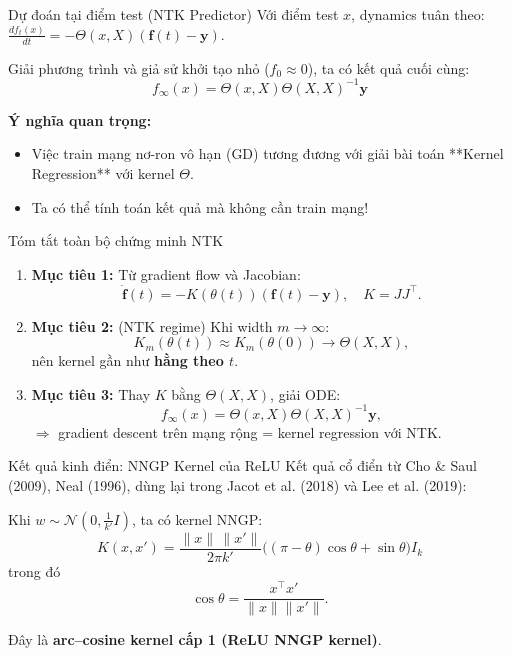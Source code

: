 \begin{frame}{Dự đoán tại điểm test (NTK Predictor)}
  Với điểm test $x$, dynamics tuân theo: $\frac{df_t(x)}{dt} = -\Theta(x,X)(\mathbf f(t) - \mathbf y)$.
  
  Giải phương trình và giả sử khởi tạo nhỏ ($f_0 \approx 0$), ta có kết quả cuối cùng:
  \[
    \boxed{ f_\infty(x) = \Theta(x,X)\Theta(X,X)^{-1}\mathbf y }
  \]

  \textbf{Ý nghĩa quan trọng:}
  \begin{itemize}
    \item Việc train mạng nơ-ron vô hạn (GD) tương đương với giải bài toán **Kernel Regression** với kernel $\Theta$.
    \item Ta có thể tính toán kết quả mà không cần train mạng!
  \end{itemize}
\end{frame}

\begin{frame}{Tóm tắt toàn bộ chứng minh NTK}
  \begin{enumerate}
    \item \textbf{Mục tiêu 1:}  
          Từ gradient flow và Jacobian:
          \[
            \dot{\mathbf f}(t)
            = -K(\theta(t))(\mathbf f(t)-\mathbf y),
            \quad K = JJ^\top.
          \]
    \item \textbf{Mục tiêu 2:} (NTK regime)  
          Khi width $m\to\infty$:
          \[
            K_m(\theta(t)) \approx K_m(\theta(0)) \to \Theta(X,X),
          \]
          nên kernel gần như \textbf{hằng theo $t$}.
    \item \textbf{Mục tiêu 3:}  
          Thay $K$ bằng $\Theta(X,X)$, giải ODE:
          \[
            f_\infty(x)
            = \Theta(x,X)\Theta(X,X)^{-1}\mathbf y,
          \]
          $\Rightarrow$ gradient descent trên mạng rộng = kernel regression với NTK.
  \end{enumerate}
\end{frame}

\begin{frame}{Kết quả kinh điển: NNGP Kernel của ReLU}
Kết quả cổ điển từ Cho \& Saul (2009), Neal (1996), dùng lại trong
Jacot et al. (2018) và Lee et al. (2019):

\vspace{0.2cm}
Khi $w \sim \mathcal N(0,\tfrac{1}{k'}I)$, ta có kernel NNGP:
\[
K(x,x')
=
\frac{\|x\|\,\|x'\|}{2\pi k'}
\Big(
(\pi - \theta)\cos\theta + \sin\theta
\Big)
I_k
\]
trong đó
\[  
\cos\theta
=
\frac{x^\top x'}{\|x\|\|x'\|}.
\]

\vspace{0.2cm}
Đây là \textbf{arc--cosine kernel cấp 1 (ReLU NNGP kernel)}.
\end{frame}

